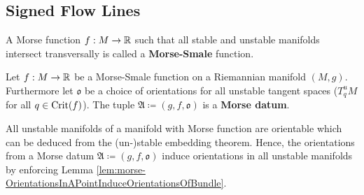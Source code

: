 \subsection{Signed Flow Lines}

\begin{definition}
	A Morse function $f:M\to \mathbb{R}$ such that all stable and unstable manifolds intersect transversally is called a \textbf{Morse-Smale} function. 
\end{definition}

\begin{definition}
	Let $f:M\to \mathbb{R}$ be a Morse-Smale function on a Riemannian manifold $(M,g)$. Furthermore let $\mathfrak{o}$ be a choice of orientations for all unstable tangent spaces ($T_q^uM$ for all $q\in \mathrm{Crit}(f)$). The tuple $\mathfrak{A}\coloneq (g,f,\mathfrak{o})$ is a \textbf{Morse datum}.
\end{definition}

\begin{proposition}\label{prop:morse-OrientedUnstableSpaces}All unstable manifolds of a manifold with Morse function are orientable which can be deduced from the (un-)stable embedding theorem. Hence, the orientations from a Morse datum $\mathfrak{A}\coloneq (g,f,\mathfrak{o})$ induce orientations in all unstable manifolds by enforcing Lemma \ref{lem:morse-OrientationsInAPointInduceOrientationsOfBundle}.
\end{proposition}

